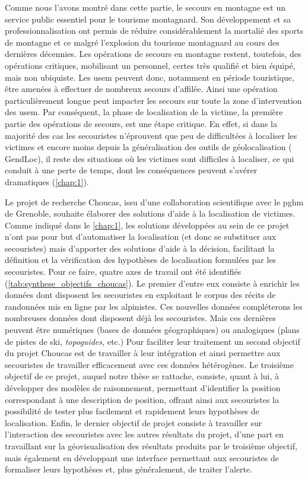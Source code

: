 Comme nous l'avons montré dans cette partie, le secours en montagne
est un service public essentiel pour le tourisme montagnard. Son
développement et sa professionnalisation ont permis de réduire
considérablement la mortalié des sports de montagne et ce malgré
l'explosion du tourisme montagnard au cours des dernières
décennies. Les opérations de secours en montagne restent, toutefois,
des opérations critiques, mobilisant un personnel, certes très
qualifié et bien équipé, mais non ubiquiste. Les \ac{usem} peuvent
donc, notamment en période touristique, être amenées à effectuer de
nombreux secours d'affilée. Ainsi une opération particulièrement
longue peut impacter les secours sur toute la zone d'intervention des
\ac{usem}. Par conséquent, la phase de localisation de la victime, \ie
la première partie des opérations de secours, est une étape
critique. En effet, si dans la majorité des cas les secouristes
n'éprouvent que peu de difficultées à localiser les victimes et encore
moins depuis la généralisation des outils de géolocalisation (\eg
GendLoc), il reste des situations où les victimes sont difficiles à
localiser, ce qui conduit à une perte de temps, dont les conséquences
peuvent s'avérer dramatiques (\autoref{chap:1}).

Le projet de recherche Choucas, issu d'une collaboration scientifique
avec le \ac{pghm} de Grenoble, souhaite élaborer des solutions d'aide
à la localisation de victimes. Comme indiqué dans le \autoref{chap:1},
les solutions développées au sein de ce projet n'ont pas pour but
d'automatiser la localisation (et donc se substituer aux secouristes)
mais d'apporter des solutions d'aide à la décision, facilitant la
définition et la vérification des hypothèses de localisation formulées
par les secouristes. Pour ce faire, quatre axes de travail ont été
identifiés (\autoref{tab:synthese_objectifs_choucas}). Le premier
d'entre eux consiste à enrichir les données dont disposent les
secouristes en exploitant le corpus des récits de randonnées mis en
ligne par les alpinistes. Ces nouvelles données compléterons les
nombreuses données dont disposent déjà les secouristes. Mais ces
dernières peuvent être numériques (\eg bases de données géographiques)
ou analogiques (\eg plans de pistes de ski, \emph{topoguides,} etc.)
%
Pour faciliter leur traitement un second objectif du projet Choucas
est de travailler à leur intégration et ainsi permettre aux
secouristes de travailler efficacement avec ces données hétérogènes.
%
Le troisième objectif de ce projet, auquel notre thèse se rattache,
consiste, quant à lui, à développer des modèles de raisonnement,
permettant d'identifier la position correspondant à une description de
position, offrant ainsi aux secouristes la possibilité de tester plus
facilement et rapidement leurs hypothèses de localisation.
%
Enfin, le dernier objectif de projet consiste à travailler sur
l'interaction des secouristes avec les autres résultats du projet,
d'une part en travaillant sur la géovisualisation des résultats
produits par le troisième objectif, mais également en développant une
interface permettant aux secouristes de formaliser leurs hypothèses
et, plus généralement, de traiter l'alerte.


